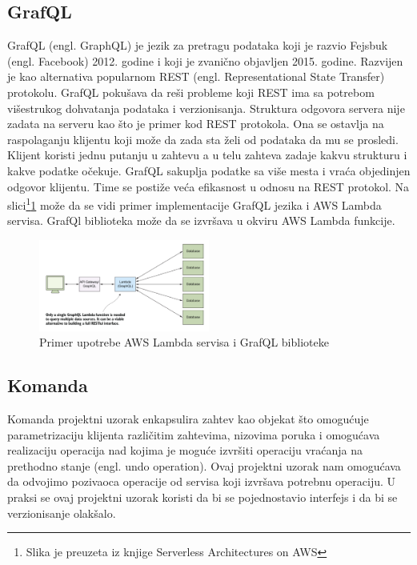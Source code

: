 \documentclass[12pt,oneside]{memoir}
\begin{document}
\subsection{GrafQL}

GrafQL (engl. GraphQL) je jezik za pretragu podataka koji je razvio Fejsbuk (engl. Facebook) 2012. godine i koji je zvanično objavljen 2015. godine\cite{gql}. Razvijen je kao alternativa popularnom REST (engl. Representational State Transfer) protokolu. GrafQL pokušava da reši probleme koji REST ima sa potrebom višestrukog dohvatanja podataka i verzionisanja. Struktura odgovora servera nije zadata na serveru kao što je primer kod REST protokola. Ona se ostavlja na raspolaganju klijentu koji može da zada sta želi od podataka da mu se prosledi. Klijent koristi jednu putanju u zahtevu a u telu zahteva zadaje kakvu strukturu i kakve podatke očekuje. GrafQL sakuplja podatke sa više mesta i vraća objedinjen odgovor klijentu. Time se postiže veća efikasnost u odnosu na REST protokol. Na slici\footnote{Slika je preuzeta iz knjige Serverless Architectures on AWS}\ref{fig:graphql} može da se vidi primer implementacije GrafQL jezika i AWS Lambda servisa. GrafQl biblioteka može da se izvršava u okviru AWS Lambda funkcije. 

\begin{figure}[!ht]
  \centering
  \includegraphics[width=0.5\textwidth]{Slika 11.png}
  \caption{Primer upotrebe AWS Lambda servisa i GrafQL biblioteke}
  \label{fig:graphql}
\end{figure}

\subsection{Komanda}
Komanda projektni uzorak enkapsulira zahtev kao objekat što omogućuje parametrizaciju klijenta različitim zahtevima, nizovima poruka i omogućava realizaciju operacija nad kojima je moguće izvršiti operaciju vraćanja na prethodno stanje (engl. undo operation)\cite{cdp}. Ovaj projektni uzorak nam omogućava da odvojimo pozivaoca operacije od servisa koji izvršava potrebnu operaciju. U praksi se ovaj projektni uzorak koristi da bi se pojednostavio interfejs i da bi se verzionisanje olakšalo.
\end{document}
